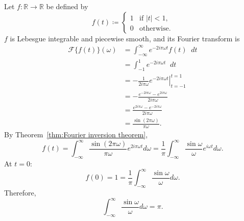 \documentclass[a4paper]{article}
\newcommand*\diff{\mathop{}\!d} %
\theoremstyle{definition}
\begin{document}
Let $f: \mathbb{R} \to \mathbb{R}$ be defined by
\begin{equation*}
    f(t) \coloneq
    \begin{cases}
        1 & \text{if } |t| < 1, \\
        0 & \text{otherwise}.
    \end{cases}
\end{equation*}
$f$ is Lebesgue integrable and piecewise smooth, and its Fourier transform is
\begin{align*}
    \mathscr{F}\{f(t)\}(\omega) & = \int_{-\infty}^{\infty} e^{-2i\pi \omega t} f(t) \diff t                \\
                                & = \int_{-1}^{1} e^{-2i\pi \omega t} \diff t                               \\
                                & = \left. - \frac{1}{2i\pi\omega} e^{-2i\pi \omega t} \right|_{t=-1}^{t=1} \\
                                & = -\frac{e^{-2i\pi \omega} - e^{2i\pi \omega}}{2i\pi\omega}               \\
                                & = \frac{e^{2i\pi \omega} - e^{-2i\pi \omega}}{2i\pi\omega}                \\
                                & = \frac{\sin(2\pi \omega)}{\pi\omega}.
\end{align*}
By Theorem~\ref{thm:Fourier inversion theorem},
\begin{equation*}
    f(t) = \int_{-\infty}^{\infty} \frac{\sin(2\pi \omega)}{\pi\omega} e^{2i\pi\omega t} d\omega = \frac{1}{\pi} \int_{-\infty}^{\infty} \frac{\sin \omega}{\omega} e^{i\omega t} d\omega.
\end{equation*}
At $t=0$:
\begin{equation*}
    f(0) = 1 = \frac{1}{\pi} \int_{-\infty}^{\infty} \frac{\sin \omega}{\omega} d\omega.
\end{equation*}
Therefore,
\begin{equation*}
    \int_{-\infty}^{\infty} \frac{\sin \omega}{\omega} d\omega = \pi.
\end{equation*}
\end{document}
